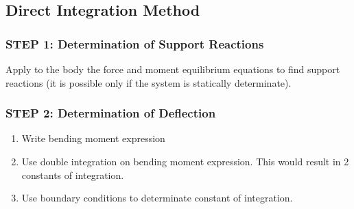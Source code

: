 \documentclass[class=report, crop=false, 12pt,a4paper]{standalone}
\begin{document}
\subsection{Direct Integration Method}
\subsubsection{STEP 1: Determination of Support Reactions}
Apply to the body the force and moment equilibrium equations to find support reactions (it is possible only if the system is statically determinate).
\subsubsection{STEP 2: Determination of Deflection}
\begin{enumerate}
  \item Write bending moment expression
  \item Use double integration on bending moment expression. This would result in 2 constants of integration.
  \item Use boundary conditions to determinate constant of integration.
\end{enumerate}
\end{document}
